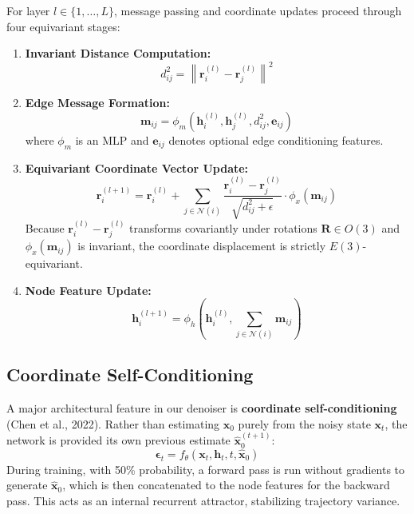 \documentclass[11pt, a4paper]{article}
\begin{document}
For layer $l \in \{1, \dots, L\}$, message passing and coordinate updates proceed through four equivariant stages:
\begin{enumerate}
    \item \textbf{Invariant Distance Computation:}
    \begin{equation}
    d_{ij}^2 = \left\| \bm{r}_i^{(l)} - \bm{r}_j^{(l)} \right\|^2
    \end{equation}
    \item \textbf{Edge Message Formation:}
    \begin{equation}
    \bm{m}_{ij} = \phi_m\left( \bm{h}_i^{(l)}, \bm{h}_j^{(l)}, d_{ij}^2, \bm{e}_{ij} \right)
    \end{equation}
    where $\phi_m$ is an MLP and $\bm{e}_{ij}$ denotes optional edge conditioning features.
    \item \textbf{Equivariant Coordinate Vector Update:}
    \begin{equation}
    \bm{r}_i^{(l+1)} = \bm{r}_i^{(l)} + \sum_{j \in \mathcal{N}(i)} \frac{\bm{r}_i^{(l)} - \bm{r}_j^{(l)}}{\sqrt{d_{ij}^2 + \epsilon}} \cdot \phi_x\left( \bm{m}_{ij} \right)
    \end{equation}
    Because $\bm{r}_i^{(l)} - \bm{r}_j^{(l)}$ transforms covariantly under rotations $\bm{R} \in O(3)$ and $\phi_x(\bm{m}_{ij})$ is invariant, the coordinate displacement is strictly $E(3)$-equivariant.
    \item \textbf{Node Feature Update:}
    \begin{equation}
    \bm{h}_i^{(l+1)} = \phi_h\left( \bm{h}_i^{(l)}, \sum_{j \in \mathcal{N}(i)} \bm{m}_{ij} \right)
    \end{equation}
\end{enumerate}

\subsection{Coordinate Self-Conditioning}
A major architectural feature in our denoiser is \textbf{coordinate self-conditioning} (Chen et al., 2022). Rather than estimating $\bm{x}_0$ purely from the noisy state $\bm{x}_t$, the network is provided its own previous estimate $\hat{\bm{x}}_0^{(t+1)}$:
\begin{equation}
\bm{\epsilon}_t = f_\theta\left(\bm{x}_t, \bm{h}_t, t, \hat{\bm{x}}_0\right)
\end{equation}
During training, with 50\% probability, a forward pass is run without gradients to generate $\hat{\bm{x}}_0$, which is then concatenated to the node features for the backward pass. This acts as an internal recurrent attractor, stabilizing trajectory variance.
\end{document}
